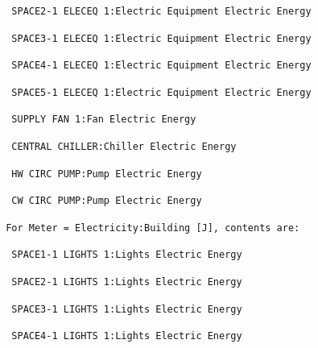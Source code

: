 \begin{lstlisting}
  SPACE2-1 ELECEQ 1:Electric Equipment Electric Energy
\end{lstlisting}

\begin{lstlisting}
  SPACE3-1 ELECEQ 1:Electric Equipment Electric Energy
\end{lstlisting}

\begin{lstlisting}
  SPACE4-1 ELECEQ 1:Electric Equipment Electric Energy
\end{lstlisting}

\begin{lstlisting}
  SPACE5-1 ELECEQ 1:Electric Equipment Electric Energy
\end{lstlisting}

\begin{lstlisting}
  SUPPLY FAN 1:Fan Electric Energy
\end{lstlisting}

\begin{lstlisting}
  CENTRAL CHILLER:Chiller Electric Energy
\end{lstlisting}

\begin{lstlisting}
  HW CIRC PUMP:Pump Electric Energy
\end{lstlisting}

\begin{lstlisting}
  CW CIRC PUMP:Pump Electric Energy
\end{lstlisting}

\begin{lstlisting}
 For Meter = Electricity:Building [J], contents are:
\end{lstlisting}

\begin{lstlisting}
  SPACE1-1 LIGHTS 1:Lights Electric Energy
\end{lstlisting}

\begin{lstlisting}
  SPACE2-1 LIGHTS 1:Lights Electric Energy
\end{lstlisting}

\begin{lstlisting}
  SPACE3-1 LIGHTS 1:Lights Electric Energy
\end{lstlisting}

\begin{lstlisting}
  SPACE4-1 LIGHTS 1:Lights Electric Energy
\end{lstlisting}

